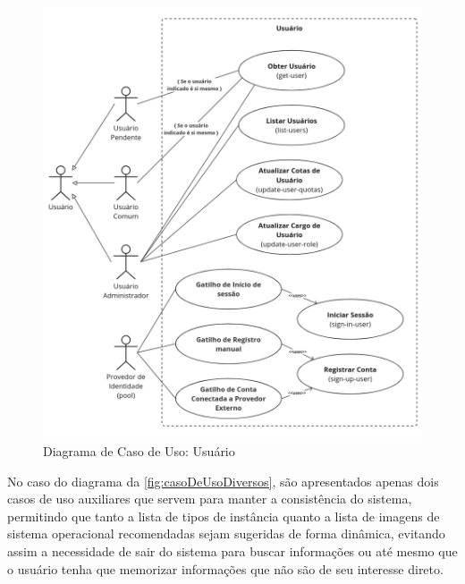 \begin{figure}[H]
\caption{Diagrama de Caso de Uso: Usuário}
\label{fig:casoDeUsoUsuario}
\includegraphics[width=\textwidth]{capitulos/2-metodologia/files/use-case-user.png}
\end{figure}

No caso do diagrama da \autoref{fig:casoDeUsoDiversos}, são apresentados apenas dois casos de uso auxiliares que servem para manter a consistência do sistema, permitindo que tanto a lista de tipos de instância quanto a lista de imagens de sistema operacional recomendadas sejam sugeridas de forma dinâmica, evitando assim a necessidade de sair do sistema para buscar informações ou até mesmo que o usuário tenha que memorizar informações que não são de seu interesse direto.

